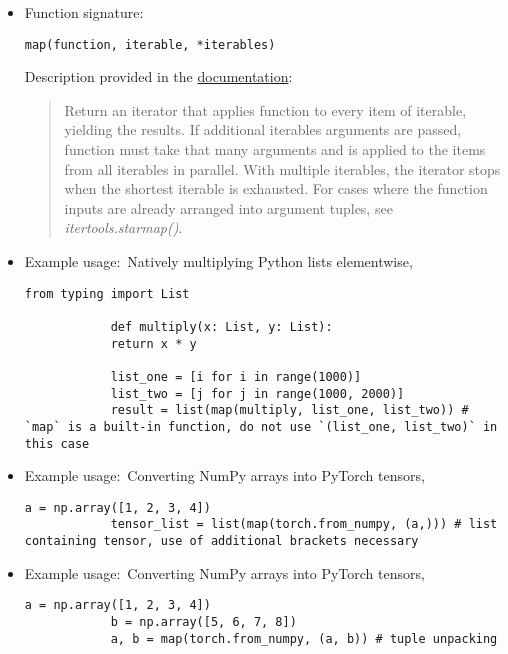 \documentclass[12pt, a4paper]{article}
\numberwithin{equation}{section}
\theoremstyle{definition}
\theoremstyle{definition}
\begin{document}
	\begin{itemize}
		\item Function signature:
		
		\begin{lstlisting}[style=mystylepython, label=alg:map__func_signa, xleftmargin=\parindent]
			map(function, iterable, *iterables)
		\end{lstlisting}
		
		Description provided in the \href{https://docs.python.org/3/library/functions.html#map}{documentation}:
		
		\begin{quote}
			Return an iterator that applies function to every item of iterable, yielding the results. If additional iterables arguments are passed, function must take that many arguments and is applied to the items from all iterables in parallel. With multiple iterables, the iterator stops when the shortest iterable is exhausted. For cases where the function inputs are already arranged into argument tuples, see \textit{itertools.starmap()}.
		\end{quote}		
		
		\item Example usage:~Natively multiplying Python lists elementwise,
		
		\begin{lstlisting}[style=mystylepython, label=alg:map__python_lists_elementwise, xleftmargin=\parindent]
			from typing import List
			
			def multiply(x: List, y: List):
			return x * y
			
			list_one = [i for i in range(1000)]
			list_two = [j for j in range(1000, 2000)]
			result = list(map(multiply, list_one, list_two)) # `map` is a built-in function, do not use `(list_one, list_two)` in this case
		\end{lstlisting}
		
		\item Example usage:~Converting NumPy arrays into PyTorch tensors,
		
		\begin{lstlisting}[style=mystylepython, label=alg:map__numpy_torch_conv, xleftmargin=\parindent]
			a = np.array([1, 2, 3, 4])
			tensor_list = list(map(torch.from_numpy, (a,))) # list containing tensor, use of additional brackets necessary
		\end{lstlisting}
	
		\item Example usage:~Converting NumPy arrays into PyTorch tensors,
		
		\begin{lstlisting}[style=mystylepython, label=alg:map__numpy_torch_tuple_unpacking, xleftmargin=\parindent]
			a = np.array([1, 2, 3, 4]) 
			b = np.array([5, 6, 7, 8]) 
			a, b = map(torch.from_numpy, (a, b)) # tuple unpacking
		\end{lstlisting}
		
	\end{itemize}
	
\end{document}
